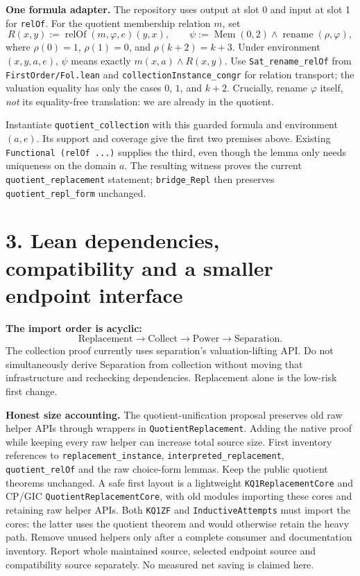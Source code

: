\documentclass[10pt]{article}
\newcommand{\code}[1]{\texttt{#1}}
\begin{document}
\textbf{One formula adapter.} The repository uses output at slot 0 and input at slot 1 for \code{relOf}. For the quotient membership relation $m$, set
\[
 R(x,y):=\operatorname{relOf}(m,\varphi,e)(y,x),\qquad
 \psi:=\operatorname{Mem}(0,2)\land\operatorname{rename}(\rho,\varphi),
\]
where $\rho(0)=1$, $\rho(1)=0$, and $\rho(k+2)=k+3$. Under environment $(x,y,a,e)$, $\psi$ means exactly $m(x,a)\land R(x,y)$. Use \code{Sat\_rename\_relOf} from \code{FirstOrder/Fol.lean} and \code{collectionInstance\_congr} for relation transport; the valuation equality has only the cases $0$, $1$, and $k+2$. Crucially, rename $\varphi$ itself, \emph{not} its equality-free translation: we are already in the quotient.

Instantiate \code{quotient\_collection} with this guarded formula and environment $(a,e)$. Its support and coverage give the first two premises above. Existing \code{Functional (relOf ...)} supplies the third, even though the lemma only needs uniqueness on the domain $a$. The resulting witness proves the current \code{quotient\_replacement} statement; \code{bridge\_Repl} then preserves \code{quotient\_repl\_form} unchanged.
\newpage
\section*{3. Lean dependencies, compatibility and a smaller endpoint interface}
\textbf{The import order is acyclic:}
\[
\text{Replacement}\to\text{Collect}\to\text{Power}\to\text{Separation}.
\]
The collection proof currently uses separation's valuation-lifting API. Do not simultaneously derive Separation from collection without moving that infrastructure and rechecking dependencies. Replacement alone is the low-risk first change.

\textbf{Honest size accounting.} The quotient-unification proposal preserves old raw helper APIs through wrappers in \code{QuotientReplacement}. Adding the native proof while keeping every raw helper can increase total source size. First inventory references to \code{replacement\_instance}, \code{interpreted\_replacement}, \code{quotient\_relOf} and the raw choice-form lemmas. Keep the public quotient theorems unchanged. A safe first layout is a lightweight \code{KQ1ReplacementCore} and CP/GIC \code{QuotientReplacementCore}, with old modules importing these cores and retaining raw helper APIs. Both \code{KQ1ZF} and \code{InductiveAttempts} must import the cores: the latter uses the quotient theorem and would otherwise retain the heavy path. Remove unused helpers only after a complete consumer and documentation inventory. Report whole maintained source, selected endpoint source and compatibility source separately. No measured net saving is claimed here.
\end{document}
